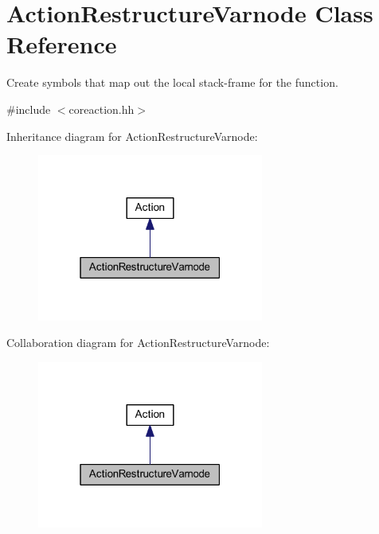 \hypertarget{class_action_restructure_varnode}{}\section{Action\+Restructure\+Varnode Class Reference}
\label{class_action_restructure_varnode}


Create symbols that map out the local stack-\/frame for the function.  




{\ttfamily \#include $<$coreaction.\+hh$>$}



Inheritance diagram for Action\+Restructure\+Varnode\+:
\nopagebreak
\begin{figure}[H]
\begin{center}
\leavevmode
\includegraphics[width=211pt]{class_action_restructure_varnode__inherit__graph}
\end{center}
\end{figure}


Collaboration diagram for Action\+Restructure\+Varnode\+:
\nopagebreak
\begin{figure}[H]
\begin{center}
\leavevmode
\includegraphics[width=211pt]{class_action_restructure_varnode__coll__graph}
\end{center}
\end{figure}
